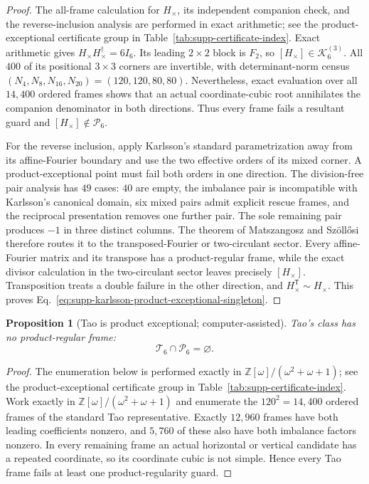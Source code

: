 \documentclass[aps,prx,reprint,nofootinbib,twoside,superscriptaddress,longbibliography,floatfix]{revtex4-2}
\newtheorem{proposition}[theorem]{Proposition}
\theoremstyle{definition}
\newcommand{\KK}{\mathcal K}
\begin{document}
\begin{proof}
{The all-frame calculation for $H_\times$, its independent companion check, and the reverse-inclusion analysis are performed in exact arithmetic; see the product-exceptional certificate group in Table~\ref{tab:supp-certificate-index}.}
Exact arithmetic gives $H_\times H_\times^\dagger=6I_6$. Its leading
$2\times2$ block is $F_2$, so $[H_\times]\in\KK_6^{(3)}$. All $400$ of its
positional $3\times3$ corners are invertible, with determinant-norm census
$(N_4,N_8,N_{16},N_{20})=(120,120,80,80)$. Nevertheless, exact evaluation
over all $14{,}400$ ordered frames shows that an actual coordinate-cubic root
annihilates the companion denominator in both directions. Thus every frame
fails a resultant guard and $[H_\times]\notin\mathcal P_6$.

For the reverse inclusion, apply Karlsson's standard parametrization away
from its affine-Fourier boundary and use the two effective orders of its
mixed corner. A product-exceptional point must fail both orders in one
direction. The division-free pair analysis has $49$ cases: $40$ are empty,
the imbalance pair is incompatible with Karlsson's canonical domain, six
mixed pairs admit explicit rescue frames, and the reciprocal presentation
removes one further pair. The sole remaining pair produces $-1$ in three
distinct columns. The theorem of Matszangosz and Sz\"oll\H{o}si
\cite{MatszangoszSzollosi2024} therefore routes it to the transposed-Fourier
or two-circulant sector. Every affine-Fourier matrix and its transpose has a
product-regular frame, while the exact divisor calculation in the
two-circulant sector leaves precisely $[H_\times]$. Transposition treats a
double failure in the other direction, and $H_\times^{\mathsf T}\sim H_\times$.
This proves Eq.~\eqref{eq:supp-karlsson-product-exceptional-singleton}.
\end{proof}


\begin{proposition}[Tao is product exceptional; computer-assisted]
\label{prop:supp-tao-product-exceptional}
Tao's class has no product-regular frame:
\begin{equation}
\mathcal T_6\cap\mathcal P_6=\varnothing.
\label{eq:supp-tao-product-exceptional}
\end{equation}
\end{proposition}

\begin{proof}
The enumeration below is performed exactly in $\mathbb Z[\omega]/(\omega^2+\omega+1)$; see the product-exceptional certificate group in Table~\ref{tab:supp-certificate-index}.
Work exactly in $\mathbb Z[\omega]/(\omega^2+\omega+1)$ and enumerate the
$120^2=14{,}400$ ordered frames of the standard Tao representative. Exactly
$12{,}960$ frames have both leading coefficients nonzero, and $5{,}760$ of
these also have both imbalance factors nonzero. In every remaining frame an
actual horizontal or vertical candidate has a repeated coordinate, so its
coordinate cubic is not simple. Hence every Tao frame fails at least one
product-regularity guard.
\end{proof}
\end{document}
